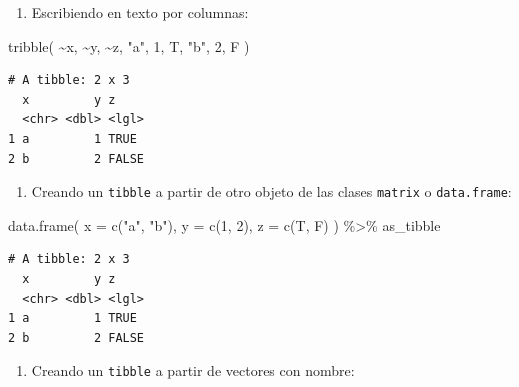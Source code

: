 \documentclass[
  letterpaper,
  DIV=11,
  numbers=noendperiod]{scrreprt}
\newenvironment{Shaded}{\begin{snugshade}}{\end{snugshade}}
\newcommand{\AttributeTok}[1]{\textcolor[rgb]{0.40,0.45,0.13}{#1}}
\newcommand{\DecValTok}[1]{\textcolor[rgb]{0.68,0.00,0.00}{#1}}
\newcommand{\FunctionTok}[1]{\textcolor[rgb]{0.28,0.35,0.67}{#1}}
\newcommand{\NormalTok}[1]{\textcolor[rgb]{0.00,0.23,0.31}{#1}}
\newcommand{\SpecialCharTok}[1]{\textcolor[rgb]{0.37,0.37,0.37}{#1}}
\newcommand{\StringTok}[1]{\textcolor[rgb]{0.13,0.47,0.30}{#1}}
\providecommand{\tightlist}{%
  \setlength{\itemsep}{0pt}\setlength{\parskip}{0pt}}\usepackage{longtable,booktabs,array}
\begin{document}
\begin{enumerate}
\def\labelenumi{\alph{enumi}.}
\setcounter{enumi}{1}
\tightlist
\item
  Escribiendo en texto por columnas:
\end{enumerate}

\begin{Shaded}
\begin{Highlighting}[]
\FunctionTok{tribble}\NormalTok{(}
  \SpecialCharTok{\textasciitilde{}}\NormalTok{x, }\SpecialCharTok{\textasciitilde{}}\NormalTok{y, }\SpecialCharTok{\textasciitilde{}}\NormalTok{z,}
  \StringTok{"a"}\NormalTok{, }\DecValTok{1}\NormalTok{, T,}
  \StringTok{"b"}\NormalTok{, }\DecValTok{2}\NormalTok{, F}
\NormalTok{)}
\end{Highlighting}
\end{Shaded}

\begin{verbatim}
# A tibble: 2 x 3
  x         y z    
  <chr> <dbl> <lgl>
1 a         1 TRUE 
2 b         2 FALSE
\end{verbatim}

\begin{enumerate}
\def\labelenumi{\alph{enumi}.}
\setcounter{enumi}{2}
\tightlist
\item
  Creando un \texttt{tibble} a partir de otro objeto de las clases
  \texttt{matrix} o \texttt{data.frame}:
\end{enumerate}

\begin{Shaded}
\begin{Highlighting}[]
\FunctionTok{data.frame}\NormalTok{(}
  \AttributeTok{x =} \FunctionTok{c}\NormalTok{(}\StringTok{"a"}\NormalTok{, }\StringTok{"b"}\NormalTok{),}
  \AttributeTok{y =} \FunctionTok{c}\NormalTok{(}\DecValTok{1}\NormalTok{, }\DecValTok{2}\NormalTok{),}
  \AttributeTok{z =} \FunctionTok{c}\NormalTok{(T, F)}
\NormalTok{) }\SpecialCharTok{\%\textgreater{}\%} 
\NormalTok{as\_tibble}
\end{Highlighting}
\end{Shaded}

\begin{verbatim}
# A tibble: 2 x 3
  x         y z    
  <chr> <dbl> <lgl>
1 a         1 TRUE 
2 b         2 FALSE
\end{verbatim}

\begin{enumerate}
\def\labelenumi{\alph{enumi}.}
\setcounter{enumi}{3}
\tightlist
\item
  Creando un \texttt{tibble} a partir de vectores con nombre:
\end{enumerate}
\end{document}
